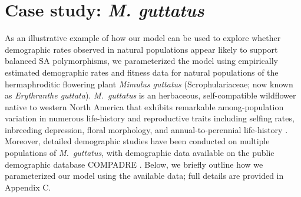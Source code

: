 \documentclass[11pt]{article}
\begin{document}
\section*{Case study: {\itshape M. guttatus}}


As an illustrative example of how our model can be used to explore whether demographic rates observed in natural populations appear likely to support balanced SA polymorphisms, we parameterized the model using empirically estimated demographic rates and fitness data for natural populations of the hermaphroditic flowering plant {\itshape Mimulus guttatus} (Scrophulariaceae; now known as {\itshape Erythranthe guttata}). {\itshape M.~guttatus} is an herbaceous, self-compatible wildflower native to western North America that exhibits remarkable among-population variation in numerous life-history and reproductive traits including selfing rates, inbreeding depression, floral morphology, and annual-to-perennial life-history \citep[e.g.,][]{RitlandGanders1987, Ritland1990, Willis1993, Willis1999a, Willis1999b, WuWillis2008}. Moreover, detailed demographic studies have been conducted on multiple populations of {\itshape M.~guttatus}, with demographic data available on the public demographic database COMPADRE \citep{CompadreDB2020}. Below, we briefly outline how we parameterized our model using the available data; full details are provided in Appendix C.
\end{document}
